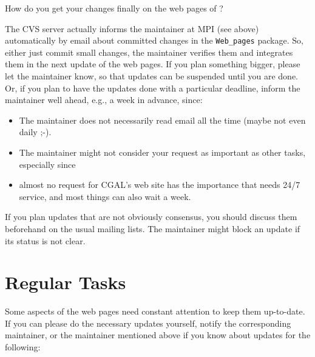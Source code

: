 How do you get your changes finally on the web pages of \cgal?

The CVS server actually informs the maintainer at MPI (see above)
automatically by email about committed changes in the
\texttt{Web\_pages} package. So, either just commit small changes, the
maintainer verifies them and integrates them in the next update of the
web pages. If you plan something bigger, please let the maintainer
know, so that updates can be suspended until you are done.  Or, if you
plan to have the updates done with a particular deadline, inform the
maintainer well ahead, e.g., a week in advance, since:

\begin{itemize}
    \item 
        The maintainer does not necessarily read email all the time
        (maybe not even daily ;-).
    \item
        The maintainer might not consider your request as important as
        other tasks, especially since 
    \item
        almost no request for CGAL's web site has the importance that needs
        24/7 service, and most things can also wait a week.
\end{itemize}

If you plan updates that are not obviously consensus, you should discuss them
beforehand on the usual mailing lists. The maintainer might block an
update if its status is not clear.


\section{Regular Tasks}

Some aspects of the web pages need constant attention to keep them
up-to-date. If you can please do the necessary updates yourself,
notify the corresponding maintainer, or the maintainer mentioned above
if you know about updates for the following:

